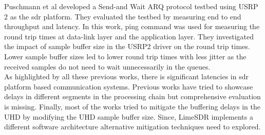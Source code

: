  
Puschmann et al \cite{puschmann_implementation_2011} developed a Send-and Wait \ac{ARQ} protocol  testbed using USRP 2 as the \ac{sdr} platform.
They evaluated the testbed by measuring end to end throughput and latency.
In this work, ping command was used for measuring the round trip times at data-link layer and the application layer.
They investigated the impact of sample buffer size in the USRP2 driver on the round trip times.
Lower sample buffer sizes led to lower round trip times with less jitter as the received samples do not need to wait unnecessarily in the queues.\\

As highlighted by all these previous works, there is significant latencies in \ac{sdr} platform based communication systems.
Previous works have tried to showcase delays in different segments in the processing chain but comprehensive evaluation is missing.
Finally, most of the works tried to mitigate the buffering delays in the \ac{UHD} by modifying the UHD sample buffer size.
Since, LimeSDR implements a different software architecture alternative mitigation techniques need to explored. 


